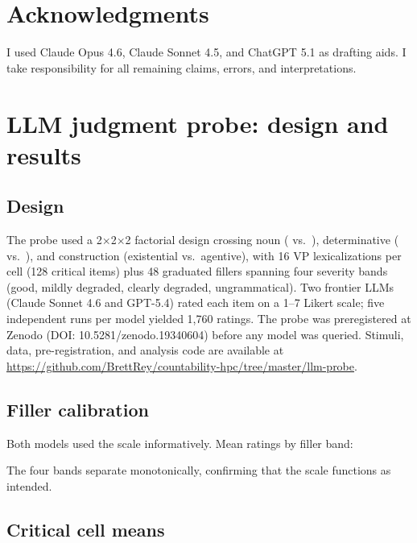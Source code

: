 \documentclass[12pt,a4paper]{article}
\begin{document}
\section*{Acknowledgments}

I used Claude Opus 4.6, Claude Sonnet 4.5, and ChatGPT 5.1 as drafting aids. I take responsibility for all remaining claims, errors, and interpretations.

\newpage

\printbibliography

\newpage
\appendix

\section{LLM judgment probe: design and results}\label{app:probe}

\subsection*{Design}

The probe used a 2$\times$2$\times$2 factorial design crossing noun ( vs.\ ), determinative ( vs.\ ), and construction (existential vs.\ agentive), with 16 VP lexicalizations per cell (128 critical items) plus 48 graduated fillers spanning four severity bands (good, mildly degraded, clearly degraded, ungrammatical). Two frontier LLMs (Claude Sonnet 4.6 and GPT-5.4) rated each item on a 1--7 Likert scale; five independent runs per model yielded 1{,}760 ratings. The probe was preregistered at Zenodo (DOI: 10.5281/zenodo.19340604) before any model was queried. Stimuli, data, pre-registration, and analysis code are available at \url{https://github.com/BrettRey/countability-hpc/tree/master/llm-probe}.

\subsection*{Filler calibration}

Both models used the scale informatively. Mean ratings by filler band:



\noindent The four bands separate monotonically, confirming that the scale functions as intended.

\subsection*{Critical cell means}
\end{document}
